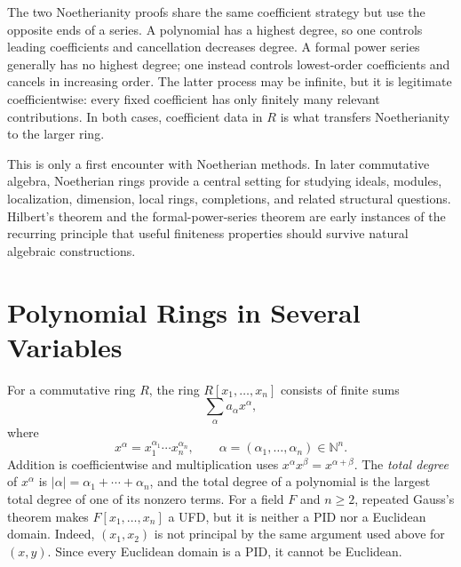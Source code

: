 The two Noetherianity proofs share the same coefficient strategy but use the
opposite ends of a series.  A polynomial has a highest degree, so one controls
leading coefficients and cancellation decreases degree.  A formal power
series generally has no highest degree; one instead controls lowest-order
coefficients and cancels in increasing order.  The latter process may be
infinite, but it is legitimate coefficientwise: every fixed coefficient has
only finitely many relevant contributions.  In both cases, coefficient data
in \(R\) is what transfers Noetherianity to the larger ring.

This is only a first encounter with Noetherian methods.  In later
commutative algebra, Noetherian rings provide a central setting for studying
ideals, modules, localization, dimension, local rings, completions, and
related structural questions.  Hilbert's theorem and the formal-power-series
theorem are early instances of the recurring principle that useful finiteness
properties should survive natural algebraic constructions.

\section{Polynomial Rings in Several Variables}
For a commutative ring \(R\), the ring \(R[x_1,\ldots,x_n]\) consists of
finite sums
\[
\sum_\alpha a_\alpha x^\alpha,
\]
where
\[
x^\alpha=x_1^{\alpha_1}\cdots x_n^{\alpha_n},\qquad
\alpha=(\alpha_1,\ldots,\alpha_n)\in\mathbb N^n.
\]
Addition is coefficientwise and multiplication uses \(x^\alpha x^\beta=
x^{\alpha+\beta}\).  The \emph{total degree} of \(x^\alpha\) is
\(|\alpha|=\alpha_1+\cdots+\alpha_n\), and the total degree of a polynomial
is the largest total degree of one of its nonzero terms.  For a field \(F\)
and \(n\ge2\), repeated Gauss's theorem makes \(F[x_1,\ldots,x_n]\) a UFD,
but it is neither a PID nor a Euclidean domain.  Indeed,
\((x_1,x_2)\) is not principal by the same argument used above for \((x,y)\).
Since every Euclidean domain is a PID, it cannot be Euclidean.

